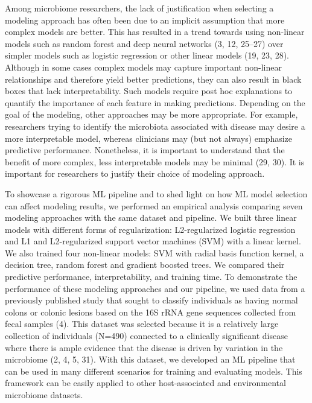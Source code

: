 \documentclass[11pt,]{article}
\begin{document}
Among microbiome researchers, the lack of justification when selecting a
modeling approach has often been due to an implicit assumption that more
complex models are better. This has resulted in a trend towards using
non-linear models such as random forest and deep neural networks (3, 12,
25--27) over simpler models such as logistic regression or other linear
models (19, 23, 28). Although in some cases complex models may capture
important non-linear relationships and therefore yield better
predictions, they can also result in black boxes that lack
interpretability. Such models require post hoc explanations to quantify
the importance of each feature in making predictions. Depending on the
goal of the modeling, other approaches may be more appropriate. For
example, researchers trying to identify the microbiota associated with
disease may desire a more interpretable model, whereas clinicians may
(but not always) emphasize predictive performance. Nonetheless, it is
important to understand that the benefit of more complex, less
interpretable models may be minimal (29, 30). It is important for
researchers to justify their choice of modeling approach.

To showcase a rigorous ML pipeline and to shed light on how ML model
selection can affect modeling results, we performed an empirical
analysis comparing seven modeling approaches with the same dataset and
pipeline. We built three linear models with different forms of
regularization: L2-regularized logistic regression and L1 and
L2-regularized support vector machines (SVM) with a linear kernel. We
also trained four non-linear models: SVM with radial basis function
kernel, a decision tree, random forest and gradient boosted trees. We
compared their predictive performance, interpretability, and training
time. To demonstrate the performance of these modeling approaches and
our pipeline, we used data from a previously published study that sought
to classify individuals as having normal colons or colonic lesions based
on the 16S rRNA gene sequences collected from fecal samples (4). This
dataset was selected because it is a relatively large collection of
individuals (N=490) connected to a clinically significant disease where
there is ample evidence that the disease is driven by variation in the
microbiome (2, 4, 5, 31). With this dataset, we developed an ML pipeline
that can be used in many different scenarios for training and evaluating
models. This framework can be easily applied to other host-associated
and environmental microbiome datasets.
\end{document}
